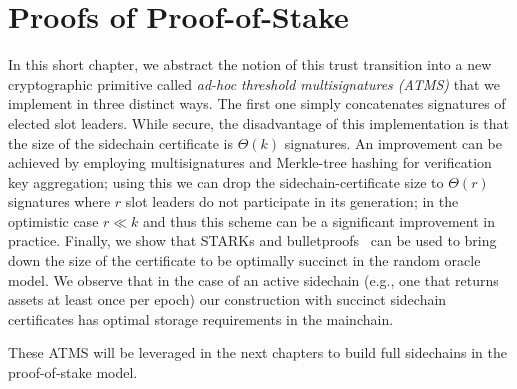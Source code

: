 \chapter{Proofs of Proof-of-Stake}\label{chapter:stake}

In this short chapter,
we abstract the notion of this trust transition into a new cryptographic
primitive called \emph{ad-hoc threshold multisignatures (ATMS)} that we
implement in three distinct ways. The first one simply concatenates signatures
of elected slot leaders. While secure, the disadvantage of this implementation
is that the size of the sidechain certificate is $\Theta(k)$ signatures. An
improvement can be achieved by employing multisignatures and Merkle-tree hashing
for verification key aggregation;  using this we can drop the
sidechain-certificate size to $\Theta(r)$ signatures where $r$  slot leaders do
not participate in its generation; in the optimistic case $r\ll k$ and thus this
scheme can be a significant improvement in practice. Finally, we show that
STARKs and bulletproofs~\cite{ben2017scalable,bulletproofs} can be used to bring
down the size of the certificate to be optimally succinct in the random oracle
model.  We observe that in the case of an active sidechain (e.g., one that
returns assets at least once per epoch) our construction with succinct sidechain
certificates has optimal storage requirements in the mainchain.

These ATMS will be leveraged in the next chapters to build full sidechains in
the proof-of-stake model.




